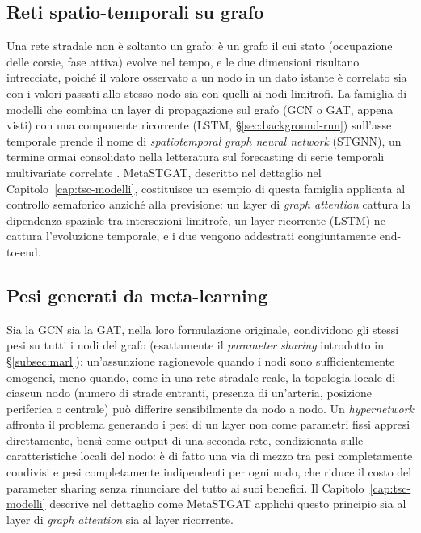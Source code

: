\subsection{Reti spatio-temporali su grafo}

Una rete stradale non è soltanto un grafo: è un grafo il cui stato
(occupazione delle corsie, fase attiva) evolve nel tempo, e le due
dimensioni risultano intrecciate, poiché il valore osservato a un nodo in
un dato istante è correlato sia con i valori passati allo stesso nodo sia
con quelli ai nodi limitrofi. La famiglia di modelli che combina un layer
di propagazione sul grafo (GCN o GAT, appena visti) con una componente
ricorrente (LSTM, §\ref{sec:background-rnn}) sull'asse temporale prende il
nome di \emph{spatiotemporal graph neural network} (STGNN), un termine
ormai consolidato nella letteratura sul forecasting di serie temporali
multivariate correlate \citep{cini2025graphdl}. MetaSTGAT, descritto nel
dettaglio nel Capitolo~\ref{cap:tsc-modelli}, costituisce un esempio di
questa famiglia applicata al controllo semaforico anziché alla previsione:
un layer di \emph{graph attention} cattura la dipendenza spaziale tra
intersezioni limitrofe, un layer ricorrente (LSTM) ne cattura l'evoluzione
temporale, e i due vengono addestrati congiuntamente end-to-end.

\subsection{Pesi generati da meta-learning}

Sia la GCN sia la GAT, nella loro formulazione originale, condividono gli
stessi pesi su tutti i nodi del grafo (esattamente il \emph{parameter
sharing} introdotto in §\ref{subsec:marl}): un'assunzione ragionevole
quando i nodi sono sufficientemente omogenei, meno quando, come in una
rete stradale reale, la topologia locale di ciascun nodo (numero di
strade entranti, presenza di un'arteria, posizione periferica o centrale)
può differire sensibilmente da nodo a nodo. Un \emph{hypernetwork}
affronta il problema generando i pesi di un layer non come parametri
fissi appresi direttamente, bensì come output di una seconda rete,
condizionata sulle caratteristiche locali del nodo: è di fatto una via di
mezzo tra pesi completamente condivisi e pesi completamente indipendenti
per ogni nodo, che riduce il costo del parameter sharing senza rinunciare
del tutto ai suoi benefici. Il Capitolo~\ref{cap:tsc-modelli} descrive nel
dettaglio come MetaSTGAT applichi questo principio sia al layer di
\emph{graph attention} sia al layer ricorrente.

